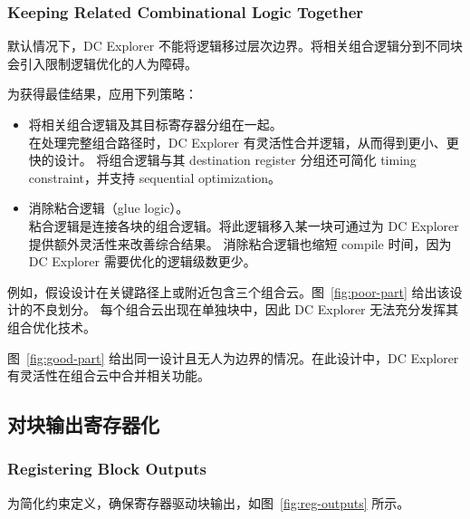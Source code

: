 \subsubsection*{Keeping Related Combinational Logic Together}

默认情况下，DC Explorer 不能将逻辑移过层次边界。将相关组合逻辑分到不同块会引入限制逻辑优化的人为障碍。

为获得最佳结果，应用下列策略：
\begin{itemize}
  \item 将相关组合逻辑及其目标寄存器分组在一起。\\
        在处理完整组合路径时，DC Explorer 有灵活性合并逻辑，从而得到更小、更快的设计。
        将组合逻辑与其 destination register 分组还可简化 timing constraint，并支持 sequential optimization。
  \item 消除粘合逻辑（glue logic）。\\
        粘合逻辑是连接各块的组合逻辑。将此逻辑移入某一块可通过为 DC Explorer 提供额外灵活性来改善综合结果。
        消除粘合逻辑也缩短 compile 时间，因为 DC Explorer 需要优化的逻辑级数更少。
\end{itemize}

例如，假设设计在关键路径上或附近包含三个组合云。图~\ref{fig:poor-part} 给出该设计的不良划分。
每个组合云出现在单独块中，因此 DC Explorer 无法充分发挥其组合优化技术。


图~\ref{fig:good-part} 给出同一设计且无人为边界的情况。在此设计中，DC Explorer 有灵活性在组合云中合并相关功能。


\subsection{对块输出寄存器化}
\subsubsection*{Registering Block Outputs}

为简化约束定义，确保寄存器驱动块输出，如图~\ref{fig:reg-outputs} 所示。


